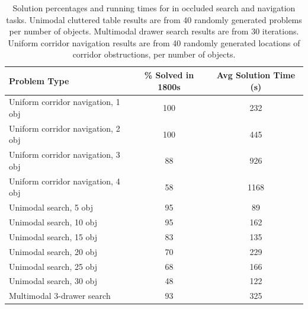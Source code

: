 \begin{table}
  \centering
  \vspace{8pt}
  \begin{tabular}{lcc}
    \toprule
      Problem Type & \% Solved in 1800s & Avg Solution Time (s)\\
    \midrule
      Uniform corridor navigation, 1 obj & 100 & 232\\
    \midrule
      Uniform corridor navigation, 2 obj & 100 & 445\\
    \midrule
      Uniform corridor navigation, 3 obj & 88 & 926\\
    \midrule
      Uniform corridor navigation, 4 obj & 58 & 1168\\
    \midrule
      Unimodal search, 5 obj & 95 & 89\\
    \midrule
      Unimodal search, 10 obj & 95 & 162\\
    \midrule
      Unimodal search, 15 obj & 83 & 135\\
    \midrule
      Unimodal search, 20 obj & 70 & 229\\
    \midrule
      Unimodal search, 25 obj & 68 & 166\\
    \midrule
      Unimodal search, 30 obj & 48 & 122\\
    \midrule
      Multimodal 3-drawer search & 93 & 325\\
    \bottomrule
  \end{tabular}
  \caption{Solution percentages and running times for \ibsp{} in
    occluded search and navigation tasks. Unimodal cluttered table results are from 40
    randomly generated problems per number of objects. Multimodal drawer search results
    are from 30 iterations. Uniform corridor navigation results are from 40 randomly
    generated locations of corridor obstructions, per number of objects.}
  \label{table:results}
\end{table}



